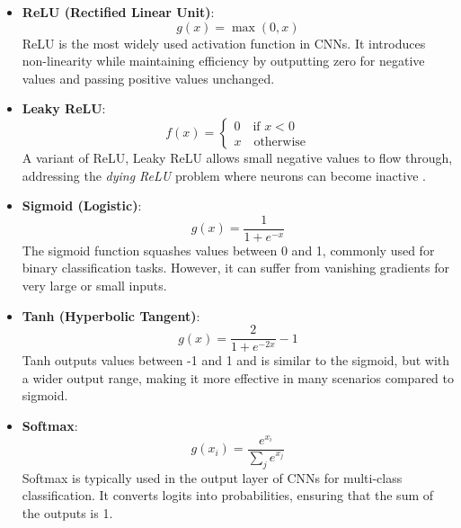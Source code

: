 \begin{itemize}
    \item \textbf{ReLU (Rectified Linear Unit)}: \label{theoretical_activations_relu}
    \begin{equation}
    g(x) = \max(0, x)
    \end{equation}
    ReLU is the most widely used activation function in CNNs. It introduces non-linearity while maintaining efficiency by outputting zero for negative values and passing positive values unchanged.

    \item \textbf{Leaky ReLU}: \label{theoretical_activations_leakyrelu}
    \begin{equation}
        f(x) =
        \begin{cases}
        0 \quad \text{if } x < 0 \\
        x \quad \text{otherwise}
        \end{cases}
    \end{equation}
    A variant of ReLU, Leaky ReLU allows small negative values to flow through, addressing the \textit{dying ReLU} problem where neurons can become inactive \cite{Lu_Lu_2020}.

    \item \textbf{Sigmoid (Logistic)}:  \label{theoretical_activations_sigmoid}
    \begin{equation}
        g(x) = \frac{1}{1 + e^{-x}}
    \end{equation}
    The sigmoid function squashes values between 0 and 1, commonly used for binary classification tasks. However, it can suffer from vanishing gradients for very large or small inputs.

    \item \textbf{Tanh (Hyperbolic Tangent)}:  \label{theoretical_activations_tanh}
    \begin{equation}
        g(x) = \frac{2}{1 + e^{-2x}} - 1
    \end{equation}
    Tanh outputs values between -1 and 1 and is similar to the sigmoid, but with a wider output range, making it more effective in many scenarios compared to sigmoid.

    \item \textbf{Softmax}: \label{theoretical_activations_softmax}
    \begin{equation}
        g(x_i) = \frac{e^{x_i}}{\sum_{j} e^{x_j}}
    \end{equation}
    Softmax is typically used in the output layer of CNNs for multi-class classification. It converts logits into probabilities, ensuring that the sum of the outputs is 1.


\end{itemize}
